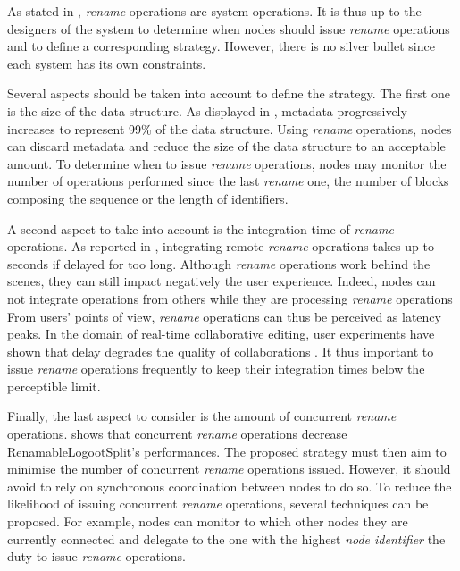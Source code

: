\documentclass[10pt,journal,compsoc]{IEEEtran}
\begin{document}
As stated in , \emph{rename} operations are system operations.
It is thus up to the designers of the system to determine when nodes should issue \emph{rename} operations and to define a corresponding strategy.
However, there is no silver bullet since each system has its own constraints.

Several aspects should be taken into account to define the strategy.
The first one is the size of the data structure.
As displayed in , metadata progressively increases to represent 99\% of the data structure.
Using \emph{rename} operations, nodes can discard metadata and reduce the size of the data structure to an acceptable amount.
To determine when to issue \emph{rename} operations, nodes may monitor the number of operations performed since the last \emph{rename} one, the number of blocks composing the sequence or the length of identifiers.

A second aspect to take into account is the integration time of \emph{rename} operations.
As reported in , integrating remote \emph{rename} operations takes up to seconds if delayed for too long.
Although \emph{rename} operations work behind the scenes, they can still impact negatively the user experience.
Indeed, nodes can not integrate operations from others while they are processing \emph{rename} operations
From users' points of view, \emph{rename} operations can thus be perceived as latency peaks.
In the domain of real-time collaborative editing, user experiments have shown that delay degrades the quality of collaborations \cite{ignat:hal-01088815,ignat:hal-01238831}.
It thus important to issue \emph{rename} operations frequently to keep their integration times below the perceptible limit.

Finally, the last aspect to consider is the amount of concurrent \emph{rename} operations.
 shows that concurrent \emph{rename} operations decrease RenamableLogootSplit's performances.
The proposed strategy must then aim to minimise the number of concurrent \emph{rename} operations issued.
However, it should avoid to rely on synchronous coordination between nodes to do so.
To reduce the likelihood of issuing concurrent \emph{rename} operations, several techniques can be proposed.
For example, nodes can monitor to which other nodes they are currently connected and delegate to the one with the highest \emph{node identifier} the duty to issue \emph{rename} operations.
\end{document}
